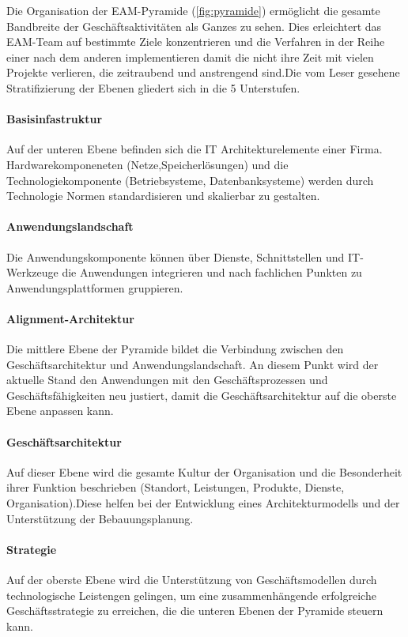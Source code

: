 \documentclass[doc]{apa6}
\begin{document}
Die Organisation der EAM-Pyramide (\ref{fig:pyramide}) ermöglicht die gesamte Bandbreite der Geschäftsaktivitäten als Ganzes zu sehen. Dies erleichtert das EAM-Team auf bestimmte Ziele konzentrieren und die Verfahren in der  Reihe einer nach dem anderen implementieren damit die nicht ihre Zeit mit vielen  Projekte verlieren, die zeitraubend und anstrengend sind.Die vom Leser gesehene Stratifizierung der Ebenen gliedert sich in die 5 Unterstufen.

\paragraph{Basisinfastruktur} Auf der unteren Ebene befinden sich die IT Architekturelemente einer Firma. Hardwarekomponeneten (Netze,Speicherlösungen) und die Technologiekomponente (Betriebsysteme, Datenbanksysteme) werden durch Technologie Normen standardisieren und skalierbar zu gestalten.

\paragraph{Anwendungslandschaft} Die Anwendungskomponente können über Dienste, Schnittstellen und IT-Werkzeuge die Anwendungen integrieren und nach fachlichen Punkten zu Anwendungsplattformen gruppieren.

\paragraph{Alignment-Architektur} Die mittlere Ebene der Pyramide bildet die Verbindung zwischen den Geschäftsarchitektur und Anwendungslandschaft. An diesem Punkt wird der aktuelle Stand den Anwendungen mit den Geschäftsprozessen und Geschäftsfähigkeiten  neu justiert, damit die Geschäftsarchitektur auf die oberste Ebene anpassen kann.

\paragraph{Geschäftsarchitektur} Auf dieser Ebene wird die gesamte Kultur der Organisation und die Besonderheit ihrer Funktion beschrieben (Standort, Leistungen, Produkte, Dienste, Organisation).Diese helfen bei der Entwicklung eines Architekturmodells und der Unterstützung der Bebauungsplanung.

\paragraph{Strategie} Auf der oberste Ebene wird die Unterstützung von Geschäftsmodellen durch technologische Leistengen gelingen, um eine zusammenhängende erfolgreiche Geschäftsstrategie zu erreichen, die die unteren Ebenen der Pyramide steuern kann.
\end{document}
